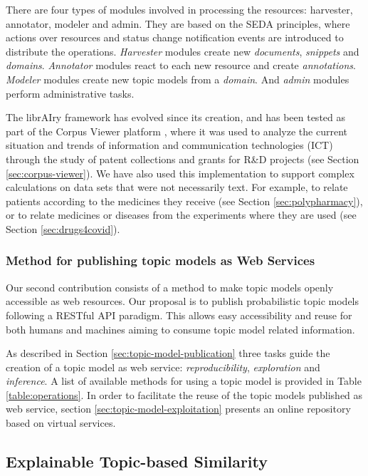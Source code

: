 There are four types of modules involved in processing the resources: harvester, annotator, modeler and admin. They are based on the SEDA principles, where actions over resources and status change notification events are introduced to distribute the operations. \textit{Harvester} modules create new \textit{documents}, \textit{snippets} and \textit{domains}. \textit{Annotator} modules react to each new resource and create \textit{annotations}. \textit{Modeler} modules create new topic models from a \textit{domain}. And \textit{admin} modules perform administrative tasks.

The librAIry framework has evolved since its creation, and has been tested as part of the Corpus Viewer platform \citep{Samy2019}, where it was used to analyze the current situation and trends of information and communication technologies (ICT) through the study of patent collections and grants for R\&D projects (see Section \ref{sec:corpus-viewer}). We have also used this implementation to support complex calculations on data sets that were not necessarily text. For example, to relate patients according to the medicines they receive \citep{Badenes-Olmedo2019c} (see Section 	\ref{sec:polypharmacy}), or to relate medicines or diseases from the experiments where they are used (see Section \ref{sec:drugs4covid}).

\subsubsection{Method for publishing topic models as Web Services}

Our second contribution consists of a method to make topic models openly accessible as web resources. Our proposal is to publish probabilistic topic models following a RESTful API paradigm. This allows easy accessibility and reuse for both humans and machines aiming to consume topic model related information.

As described in Section \ref{sec:topic-model-publication} three tasks guide the creation of a topic model as web service: \textit{reproducibility}, \textit{exploration} and \textit{inference}. A list of available methods for using a topic model is provided in Table \ref{table:operations}. In order to facilitate the reuse of the topic models published as web service, section \ref{sec:topic-model-exploitation} presents an online repository based on virtual services.

\subsection{Explainable Topic-based Similarity}

